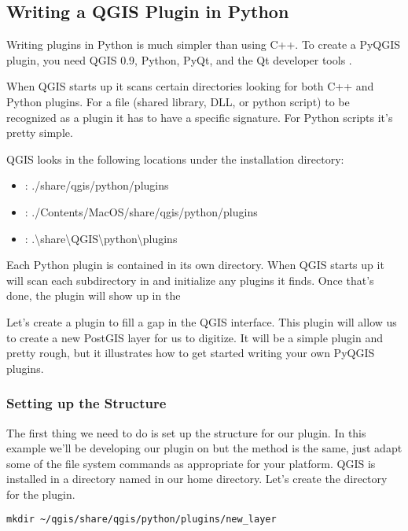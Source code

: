 \subsection{Writing a QGIS Plugin in Python}

Writing plugins in Python is much simpler than using C++.
To create a PyQGIS plugin, you need QGIS 0.9, Python, PyQt, and the Qt developer tools \cite{sherman07}.

When QGIS starts up it scans certain directories looking for both C++ and Python plugins.
For a file (shared library, DLL, or python script) to be recognized as a plugin it has to have a specific signature.
For Python scripts it's pretty simple.

QGIS looks in the following locations under the installation directory:

\begin{itemize}
\item {}: ./share/qgis/python/plugins
\item {}: ./Contents/MacOS/share/qgis/python/plugins
\item {}: .\textbackslash share\textbackslash QGIS\textbackslash python\textbackslash plugins
\end{itemize}

Each Python plugin is contained in its own directory.
When QGIS starts up it will scan each subdirectory in  and initialize any plugins it finds.
Once that's done, the plugin will show up in the 

Let's create a plugin to fill a gap in the QGIS interface.
This plugin will allow us to create a new PostGIS layer for us to digitize.
It will be a simple plugin and pretty rough, but it illustrates how to get started writing your own PyQGIS plugins.

\subsubsection{Setting up the Structure}
The first thing we need to do is set up the structure for our plugin.
In this example we'll be developing our plugin on  but the method is the same, just adapt some of the file system commands as appropriate for your platform.
QGIS is installed in a directory named  in our home directory.
Let's create the directory for the plugin.

\begin{verbatim}
mkdir ~/qgis/share/qgis/python/plugins/new_layer
\end{verbatim}

